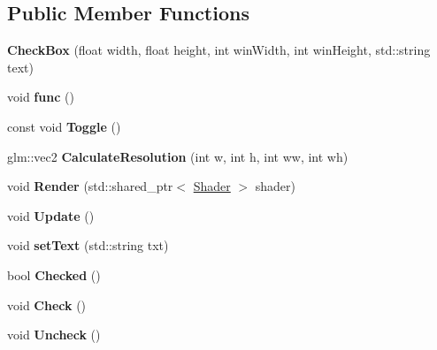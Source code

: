 \subsection*{Public Member Functions}
\begin{DoxyCompactItemize}
\item 
{\bfseries Check\+Box} (float width, float height, int win\+Width, int win\+Height, std\+::string text)\hypertarget{class_check_box_a3d9390cf35471e93face354b98ff3001}{}\label{class_check_box_a3d9390cf35471e93face354b98ff3001}

\item 
void {\bfseries func} ()\hypertarget{class_check_box_a0b97039dee9e859cc9eb30d72e133a14}{}\label{class_check_box_a0b97039dee9e859cc9eb30d72e133a14}

\item 
const void {\bfseries Toggle} ()\hypertarget{class_check_box_a167a810d2ccddb3fec5a91520b6ae814}{}\label{class_check_box_a167a810d2ccddb3fec5a91520b6ae814}

\item 
glm\+::vec2 {\bfseries Calculate\+Resolution} (int w, int h, int ww, int wh)\hypertarget{class_check_box_ace23379528e35190569cf3e390d4632f}{}\label{class_check_box_ace23379528e35190569cf3e390d4632f}

\item 
void {\bfseries Render} (std\+::shared\+\_\+ptr$<$ \hyperlink{class_shader}{Shader} $>$ shader)\hypertarget{class_check_box_a52282c55293a750f37515b9bf1dc8aca}{}\label{class_check_box_a52282c55293a750f37515b9bf1dc8aca}

\item 
void {\bfseries Update} ()\hypertarget{class_check_box_a9ac8ab23419163e51aeb4bcf0a3b3114}{}\label{class_check_box_a9ac8ab23419163e51aeb4bcf0a3b3114}

\item 
void {\bfseries set\+Text} (std\+::string txt)\hypertarget{class_check_box_a9d2970b875aa42e476e656dfa0533e27}{}\label{class_check_box_a9d2970b875aa42e476e656dfa0533e27}

\item 
bool {\bfseries Checked} ()\hypertarget{class_check_box_a06cc98fa2259372559948cfe4656288c}{}\label{class_check_box_a06cc98fa2259372559948cfe4656288c}

\item 
void {\bfseries Check} ()\hypertarget{class_check_box_abab1504cfd126c3b13338db6171ae2d5}{}\label{class_check_box_abab1504cfd126c3b13338db6171ae2d5}

\item 
void {\bfseries Uncheck} ()\hypertarget{class_check_box_a79d07104121045ab7589e5bcee43c4c1}{}\label{class_check_box_a79d07104121045ab7589e5bcee43c4c1}

\end{DoxyCompactItemize}

